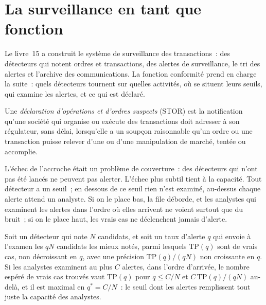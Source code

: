 \section{La surveillance en tant que fonction}

Le livre~15 a construit le système de surveillance des transactions~: des détecteurs qui notent ordres et transactions, des alertes de surveillance, le tri des alertes et l'archive des communications.
La fonction conformité prend en charge la suite~: quels détecteurs tournent sur quelles activités, où se situent leurs seuils, qui examine les alertes, et
ce qui est déclaré.

\begin{definition}\label{def:fm:compliance-and-market-abuse:stor}
Une \emph{déclaration d'opérations et d'ordres suspects} (STOR) est la notification qu'une société qui organise ou
exécute des transactions doit adresser à son régulateur, sans délai, lorsqu'elle a un soupçon raisonnable qu'un ordre ou une transaction puisse relever d'une  ou d'une manipulation de marché, tentée ou accomplie.
\end{definition}

L'échec de l'accroche était un problème de couverture~: des détecteurs qui n'ont pas été lancés ne peuvent pas alerter. L'échec plus subtil tient à la capacité. Tout détecteur a un seuil~; en dessous
de ce seuil rien n'est examiné, au-dessus chaque alerte attend un analyste. Si on le place bas, la file déborde, et les analystes qui examinent les alertes dans l'ordre où elles arrivent
ne voient surtout que du bruit~; si on le place haut, les vrais cas ne déclenchent jamais d'alerte.

\begin{proposition}\label{prop:fm:compliance-and-market-abuse:queue}
Soit un détecteur qui note $N$ candidats, et soit un taux d'alerte $q$ qui envoie à l'examen les $qN$ candidats les mieux notés, parmi lesquels $\mathrm{TP}(q)$ sont de vrais cas,
non décroissant en $q$, avec une précision $\mathrm{TP}(q)/(qN)$ non croissante en $q$. Si les analystes examinent au plus $C$ alertes, dans l'ordre d'arrivée, le
nombre espéré de vrais cas trouvés vaut $\mathrm{TP}(q)$ pour $q\le C/N$ et $C\,\mathrm{TP}(q)/(qN)$ au-delà, et il est maximal en $q^*=C/N$~: le
seuil dont les alertes remplissent tout juste la capacité des analystes.
\end{proposition}

